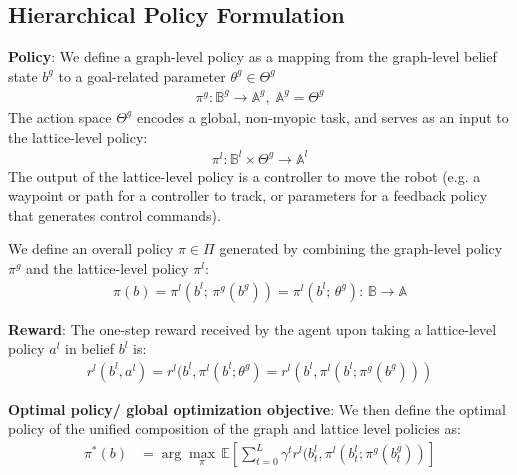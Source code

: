 \documentclass{article}
\newcommand{\ph}[1]{{\textbf{#1}:}} %
\begin{document}
\subsection{Hierarchical Policy Formulation}
\label{sec:hierarchical_policy}
\ph{Policy} We define a graph-level policy as a mapping from the graph-level belief state $b^g$ to a goal-related parameter $\theta^g \in \Theta^g$ 
\begin{align}
    \pi^g : \mathbb{B}^g \to \mathbb{A}^g, \; \mathbb{A}^g = \Theta^g
\end{align}
The action space $\Theta^g$ encodes a global, non-myopic task, and serves as an input to the lattice-level policy: 
\begin{align}
    \pi^l: \mathbb{B}^l \times \Theta^g \to \mathbb{A}^l
\end{align}
The output of the lattice-level policy is a controller to move the robot (e.g. a waypoint or path for a controller to track, or parameters for a feedback policy that generates control commands).

We define an overall policy $\pi \in \Pi$ generated by combining the graph-level policy $\pi^g$ and the lattice-level policy $\pi^l$:
\begin{align}
    \pi(b) = \pi^l(b^l; \, \pi^g(b^g)) = \pi^l(b^l; \, \theta^g) : \, \mathbb{B}\rightarrow \mathbb{A} 
\end{align}

\ph{Reward} The one-step reward received by the agent upon taking a lattice-level policy $a^l$ in belief $b^l$ is:
\begin{align}
    r^l(b^l, a^l) = r^l(b^l, \pi^l(b^l; \theta^g) = r^l(b^l, \pi^l(b^l; \pi^g(b^g)))
\end{align}

\ph{Optimal policy/ global optimization objective} We then define the optimal policy of the unified composition of the graph and lattice level policies as:
\begin{align}
  \pi^{*}(b) &= \arg\max_\pi \, \mathbb{E} \left[ \sum_{t=0}^{L} \gamma^t r^l(b^l_t, \pi^l(b^l_t; \pi^g(b^g_t)) \right]
  \label{eq:optimal_policy_unified}
\end{align}
\end{document}
